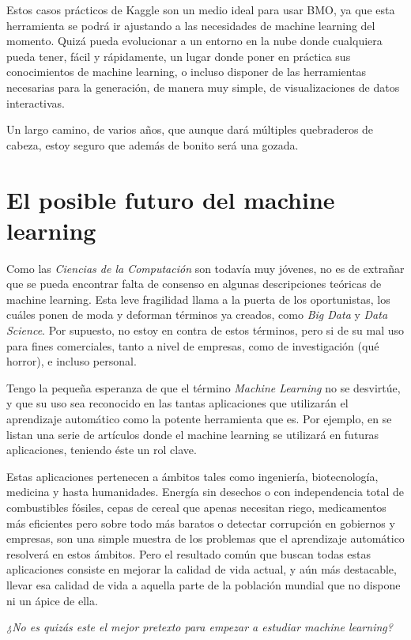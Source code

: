 Estos casos prácticos de Kaggle son un medio ideal para usar BMO, ya que esta herramienta se podrá ir ajustando a las necesidades de machine learning del momento. Quizá pueda evolucionar a un entorno en la nube donde cualquiera pueda tener, fácil y rápidamente, un lugar donde poner en práctica sus conocimientos de machine learning, o incluso disponer de las herramientas necesarias para la generación, de manera muy simple, de visualizaciones de datos interactivas.

Un largo camino, de varios años, que aunque dará múltiples quebraderos de cabeza, estoy seguro que además de bonito será una gozada.

\section{El posible futuro del machine learning} \label{sec:6.3}

Como las \emph{Ciencias de la Computación} son todavía muy jóvenes, no es de extrañar que se pueda encontrar falta de consenso en algunas descripciones teóricas de machine learning. Esta leve fragilidad llama a la puerta de los oportunistas, los cuáles ponen de moda y deforman términos ya creados, como \emph{Big Data} y \emph{Data Science}. Por supuesto, no estoy en contra de estos términos, pero si de su mal uso para fines comerciales, tanto a nivel de empresas, como de investigación (qué horror), e incluso personal.

Tengo la pequeña esperanza de que el término \emph{Machine Learning} no se desvirtúe, y que su uso sea reconocido en las tantas aplicaciones que utilizarán el aprendizaje automático como la potente herramienta que es. Por ejemplo, en \cite{kantardzic2005next} se listan una serie de artículos donde el machine learning se utilizará en futuras aplicaciones, teniendo éste un rol clave.

Estas aplicaciones pertenecen a ámbitos tales como ingeniería, biotecnología, medicina y hasta humanidades. Energía sin desechos o con independencia total de combustibles fósiles, cepas de cereal que apenas necesitan riego, medicamentos más eficientes pero sobre todo más baratos o detectar corrupción en gobiernos y empresas, son una simple muestra de los problemas que el aprendizaje automático resolverá en estos ámbitos. Pero el resultado común que buscan todas estas aplicaciones consiste en mejorar la calidad de vida actual, y aún más destacable, llevar esa calidad de vida a aquella parte de la población mundial que no dispone ni un ápice de ella.

\emph{¿No es quizás este el mejor pretexto para empezar a estudiar machine learning?}
